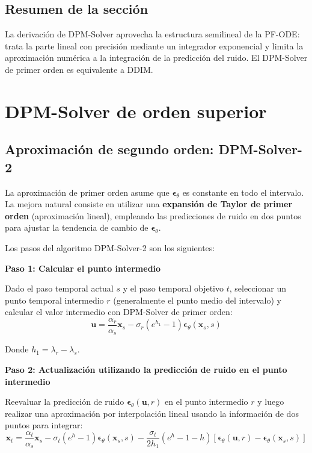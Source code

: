 \documentclass[a4paper]{article}
\begin{document}
\subsection{Resumen de la sección}

La derivación de DPM-Solver aprovecha la estructura semilineal de la PF-ODE: trata la parte lineal con precisión mediante un integrador exponencial y limita la aproximación numérica a la integración de la predicción del ruido. El DPM-Solver de primer orden es equivalente a DDIM.

\section{DPM-Solver de orden superior}

\subsection{Aproximación de segundo orden: DPM-Solver-2}

La aproximación de primer orden asume que $\boldsymbol{\epsilon}_\theta$ es constante en todo el intervalo. La mejora natural consiste en utilizar una \textbf{expansión de Taylor de primer orden} (aproximación lineal), empleando las predicciones de ruido en dos puntos para ajustar la tendencia de cambio de $\boldsymbol{\epsilon}_\theta$.

Los pasos del algoritmo DPM-Solver-2 son los siguientes:

\textbf{Paso 1: Calcular el punto intermedio}

Dado el paso temporal actual $s$ y el paso temporal objetivo $t$, seleccionar un punto temporal intermedio $r$ (generalmente el punto medio del intervalo) y calcular el valor intermedio con DPM-Solver de primer orden:
$$\mathbf{u} = \frac{\alpha_r}{\alpha_s} \mathbf{x}_s - \sigma_r (e^{h_1} - 1) \boldsymbol{\epsilon}_\theta(\mathbf{x}_s, s)$$

Donde $h_1 = \lambda_r - \lambda_s$.

\textbf{Paso 2: Actualización utilizando la predicción de ruido en el punto intermedio}

Reevaluar la predicción de ruido $\boldsymbol{\epsilon}_\theta(\mathbf{u}, r)$ en el punto intermedio $r$ y luego realizar una aproximación por interpolación lineal usando la información de dos puntos para integrar:
$$\mathbf{x}_t = \frac{\alpha_t}{\alpha_s} \mathbf{x}_s - \sigma_t (e^{h} - 1) \boldsymbol{\epsilon}_\theta(\mathbf{x}_s, s) - \frac{\sigma_t}{2h_1}(e^{h} - 1 - h)\left[\boldsymbol{\epsilon}_\theta(\mathbf{u}, r) - \boldsymbol{\epsilon}_\theta(\mathbf{x}_s, s)\right]$$
\end{document}
